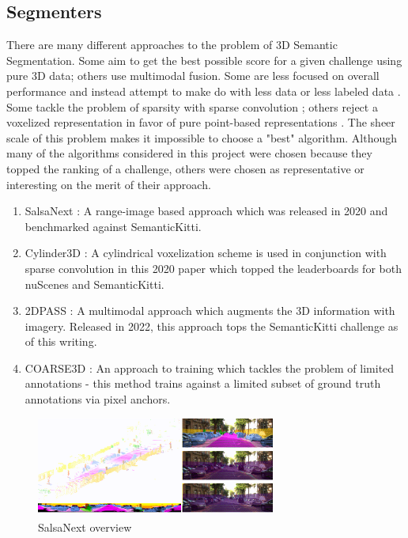 \subsection{Segmenters}
\label{chap:segmenters}

There are many different approaches to the problem of 3D Semantic Segmentation. Some aim to get the best possible score for a given challenge using pure 3D data; others use multimodal fusion. Some are less focused on overall performance and instead attempt to make do with less data or less labeled data \cite{2dpass}. Some tackle the problem of sparsity with sparse convolution \cite{SPARSECONV}; others reject a voxelized representation in favor of pure point-based representations \cite{pointnet}. The sheer scale of this problem makes it impossible to choose a "best" algorithm. Although many of the algorithms considered in this project were chosen because they topped the ranking of a challenge, others were chosen as representative or interesting on the merit of their approach.

\begin{enumerate}
  \item SalsaNext \cite{salsanext}: A range-image based approach which was released in 2020 and benchmarked against SemanticKitti.
  \item Cylinder3D \cite{cylinder3d}: A cylindrical voxelization scheme is used in conjunction with sparse convolution in this 2020 paper which topped the leaderboards for both nuScenes and SemanticKitti.
  \item 2DPASS \cite{2dpass}: A multimodal approach which augments the 3D information with imagery. Released in 2022, this approach tops the SemanticKitti challenge as of this writing.
  \item COARSE3D \cite{coarse3d}: An approach to training which tackles the problem of limited annotations - this method trains against a limited subset of ground truth annotations via pixel anchors.
\end{enumerate}


\begin{figure}[htp]
  \centering
  \includegraphics[width=0.7\textwidth]{images/salsanext_overview.png}
  \caption{SalsaNext overview}
  \label{fig:salsanext-overview}
\end{figure}

